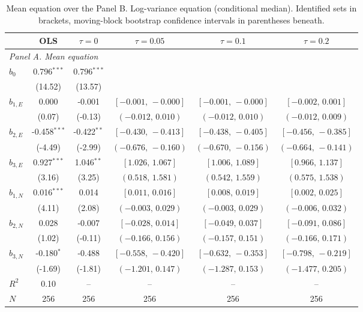 \begin{table}[!htbp]
\centering
\begin{threeparttable}
\caption{Mean equation over the Panel B. Log-variance equation (conditional median). Identified sets in brackets, moving-block bootstrap confidence intervals in parentheses beneath.}
\label{tab:log_var_eq_panel_lad}
\scriptsize\setlength{\tabcolsep}{3pt}
\begin{tabular}{lccccc}
\toprule
 & OLS & $\tau{=}0$ & $\tau{=}0.05$ & $\tau{=}0.1$ & $\tau{=}0.2$ \\
\midrule
\multicolumn{6}{l}{\textit{Panel A. Mean equation}} \\
\midrule
$b_0$ & 0.796$^{***}$ & 0.796$^{***}$ &  &  &  \\
 & (14.52) & (13.57) &  &  &  \\
$b_{1,E}$ & 0.000 & -0.001 & $[-0.001,\,-0.000]$ & $[-0.001,\,-0.000]$ & $[-0.002,\,0.001]$ \\
 & (0.07) & (-0.13) & $(-0.012,\,0.010)$ & $(-0.012,\,0.010)$ & $(-0.012,\,0.009)$ \\
$b_{2,E}$ & -0.458$^{***}$ & -0.422$^{**}$ & $[-0.430,\,-0.413]$ & $[-0.438,\,-0.405]$ & $[-0.456,\,-0.385]$ \\
 & (-4.49) & (-2.99) & $(-0.676,\,-0.160)$ & $(-0.670,\,-0.156)$ & $(-0.664,\,-0.141)$ \\
$b_{3,E}$ & 0.927$^{***}$ & 1.046$^{**}$ & $[1.026,\,1.067]$ & $[1.006,\,1.089]$ & $[0.966,\,1.137]$ \\
 & (3.16) & (3.25) & $(0.518,\,1.581)$ & $(0.542,\,1.559)$ & $(0.575,\,1.538)$ \\
\midrule
$b_{1,N}$ & 0.016$^{***}$ & 0.014 & $[0.011,\,0.016]$ & $[0.008,\,0.019]$ & $[0.002,\,0.025]$ \\
 & (4.11) & (2.08) & $(-0.003,\,0.029)$ & $(-0.003,\,0.029)$ & $(-0.006,\,0.032)$ \\
$b_{2,N}$ & 0.028 & -0.007 & $[-0.028,\,0.014]$ & $[-0.049,\,0.037]$ & $[-0.091,\,0.086]$ \\
 & (1.02) & (-0.11) & $(-0.166,\,0.156)$ & $(-0.157,\,0.151)$ & $(-0.166,\,0.171)$ \\
$b_{3,N}$ & -0.180$^{*}$ & -0.488 & $[-0.558,\,-0.420]$ & $[-0.632,\,-0.353]$ & $[-0.798,\,-0.219]$ \\
 & (-1.69) & (-1.81) & $(-1.201,\,0.147)$ & $(-1.287,\,0.153)$ & $(-1.477,\,0.205)$ \\
\midrule
$R^2$ & 0.10 & -- & -- & -- & -- \\
$N$ & 256 & 256 & 256 & 256 & 256 \\

\end{tabular}
\end{threeparttable}
\end{table}
